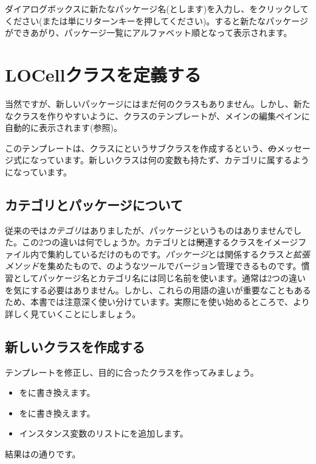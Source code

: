 \documentclass[a4paper,10pt,twoside]{book}
\begin{document}
ダイアログボックスに新たなパッケージ名(とします)を入力し、をクリックしてください(または単にリターンキーを押してください)。すると新たなパッケージができあがり、パッケージ一覧にアルファベット順となって表示されます。

\section{LOCellクラスを定義する}

当然ですが、新しいパッケージにはまだ何のクラスもありません。しかし、新たなクラスを作りやすいように、クラスのテンプレートが、メインの編集ペインに自動的に表示されます(参照)。

このテンプレートは、クラスにというサブクラスを作成するという、\st のメッセージ式になっています。新しいクラスは何の変数も持たず、カテゴリに属するようになっています。

\subsection{カテゴリとパッケージについて}

従来の\st では\emph{カテゴリ}はありましたが、パッケージというものはありませんでした。この2つの違いは何でしょうか。カテゴリとは\st 関連するクラスをイメージファイル内で集約しているだけのものです。\emph{パッケージ}とは関係するクラス\emph{と拡張メソッド}を集めたもので、のようなツールでバージョン管理できるものです。慣習としてパッケージ名とカテゴリ名には同じ名前を使います。通常は2つの違いを気にする必要はありません。しかし、これらの用語の違いが重要なこともあるため、本書では注意深く使い分けています。実際にを使い始めるところで、より詳しく見ていくことにしましょう。


\subsection{新しいクラスを作成する}

テンプレートを修正し、目的に合ったクラスを作ってみましょう。

\begin{itemize}
  \item {}をに書き換えます。
  \item {}をに書き換えます。
  \item インスタンス変数のリストにを追加します。
\end{itemize}
結果はの通りです。
\end{document}
